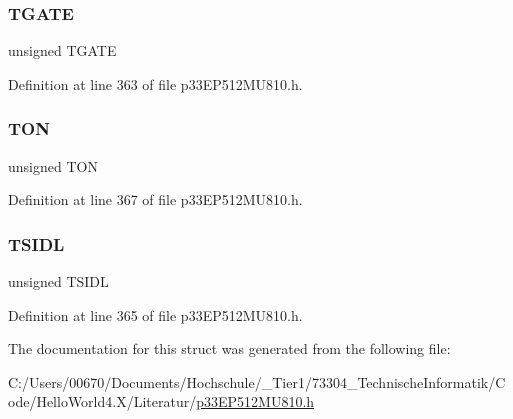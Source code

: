 \subsubsection{\texorpdfstring{T\+G\+A\+TE}{TGATE}}
{\footnotesize\ttfamily unsigned T\+G\+A\+TE}



Definition at line 363 of file p33\+E\+P512\+M\+U810.\+h.

\mbox{\label{structtag_t5_c_o_n_b_i_t_s_a8c2a094047d1019ce1c5b25ea8cff9b3}} 
\subsubsection{\texorpdfstring{T\+ON}{TON}}
{\footnotesize\ttfamily unsigned T\+ON}



Definition at line 367 of file p33\+E\+P512\+M\+U810.\+h.

\mbox{\label{structtag_t5_c_o_n_b_i_t_s_a4971b881615ef42703b5b78179fcda3d}} 
\subsubsection{\texorpdfstring{T\+S\+I\+DL}{TSIDL}}
{\footnotesize\ttfamily unsigned T\+S\+I\+DL}



Definition at line 365 of file p33\+E\+P512\+M\+U810.\+h.



The documentation for this struct was generated from the following file\+:\begin{DoxyCompactItemize}
\item 
C\+:/\+Users/00670/\+Documents/\+Hochschule/\+\_\+\+Tier1/73304\+\_\+\+Technische\+Informatik/\+Code/\+Hello\+World4.\+X/\+Literatur/\hyperlink{p33_e_p512_m_u810_8h}{p33\+E\+P512\+M\+U810.\+h}\end{DoxyCompactItemize}
